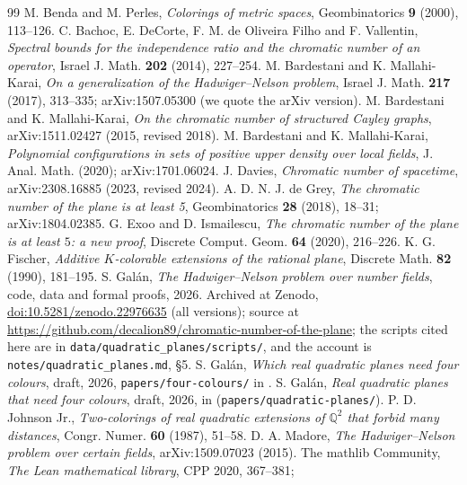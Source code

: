 \documentclass[11pt,a4paper]{amsart}
\theoremstyle{remark}
\newcommand{\Q}{\mathbb{Q}}
\begin{document}
\begin{thebibliography}{99}
 M. Benda and M. Perles, \emph{Colorings of metric spaces}, Geombinatorics \textbf{9} (2000), 113--126.
 C. Bachoc, E. DeCorte, F. M. de Oliveira Filho and F. Vallentin, \emph{Spectral bounds for the
independence ratio and the chromatic number of an operator}, Israel J. Math. \textbf{202} (2014), 227--254.
 M. Bardestani and K. Mallahi-Karai, \emph{On a generalization of the Hadwiger--Nelson problem},
Israel J. Math. \textbf{217} (2017), 313--335; arXiv:1507.05300 (we quote the arXiv version).
 M. Bardestani and K. Mallahi-Karai, \emph{On the chromatic number of structured Cayley graphs},
arXiv:1511.02427 (2015, revised 2018).
 M. Bardestani and K. Mallahi-Karai, \emph{Polynomial configurations in sets of positive upper
density over local fields}, J. Anal. Math. (2020); arXiv:1701.06024.
 J. Davies, \emph{Chromatic number of spacetime}, arXiv:2308.16885 (2023, revised 2024).
 A. D. N. J. de Grey, \emph{The chromatic number of the plane is at least 5}, Geombinatorics
\textbf{28} (2018), 18--31; arXiv:1804.02385.
 G. Exoo and D. Ismailescu, \emph{The chromatic number of the plane is at least $5$: a new proof},
Discrete Comput. Geom. \textbf{64} (2020), 216--226.
 K. G. Fischer, \emph{Additive $K$-colorable extensions of the rational plane}, Discrete
Math. \textbf{82} (1990), 181--195.
 S. Gal\'an, \emph{The Hadwiger--Nelson problem over number fields}, code, data and formal
proofs, 2026. Archived at Zenodo, \href{https://doi.org/10.5281/zenodo.22976635}{doi:10.5281/zenodo.22976635}
(all versions); source at \url{https://github.com/decalion89/chromatic-number-of-the-plane}; the scripts cited here
are in \texttt{data/quadratic\_planes/scripts/}, and the account is \texttt{notes/quadratic\_planes.md}, \S5.
 S. Gal\'an, \emph{Which real quadratic planes need four colours}, draft, 2026,
\texttt{papers/four-colours/} in \cite{Repo}.
 S. Gal\'an, \emph{Real quadratic planes that need four colours}, draft, 2026, in \cite{Repo}
(\texttt{papers/quadratic-planes/}).
 P. D. Johnson Jr., \emph{Two-colorings of real quadratic extensions of $\Q^2$ that forbid
many distances}, Congr. Numer. \textbf{60} (1987), 51--58.
 D. A. Madore, \emph{The Hadwiger--Nelson problem over certain fields}, arXiv:1509.07023 (2015).
 The mathlib Community, \emph{The Lean mathematical library}, CPP 2020, 367--381;

\end{thebibliography}
\end{document}

